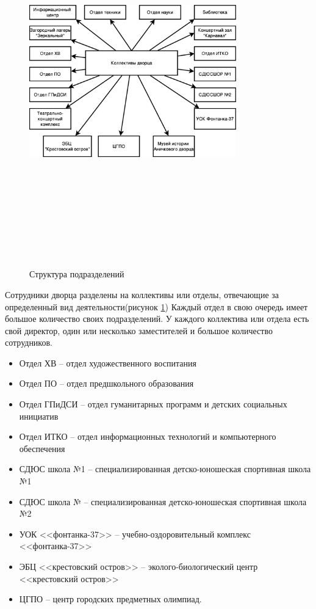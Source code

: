 \documentclass[utf8,usehyperref,12pt]{G7-32}
\begin{document}
\begin{figure}[ht]
   \centering%
   \includegraphics[height=160mm, width=0.8\textwidth, clip, keepaspectratio]{pictures/org_struct.eps}
   \caption{Структура подразделений}\label{fig:org_structure}
 \end{figure}


Сотрудники дворца разделены на коллективы или отделы, отвечающие за определенный вид деятельности(рисунок \ref{fig:org_structure}) 
Каждый отдел в свою очередь имеет большое количество своих подразделений. У каждого коллектива или отдела есть свой директор, один или несколько заместителей и большое количество сотрудников.


\begin{itemize}
\item Отдел ХВ – отдел художественного воспитания
\item Отдел ПО – отдел предшкольного  образования
\item Отдел ГПиДСИ – отдел гуманитарных программ и детских социальных инициатив
\item Отдел ИТКО – отдел информационных технологий и компьютерного обеспечения
\item СДЮС школа №1 – специализированная детско-юношеская спортивная школа №1
\item СДЮС школа № – специализированная детско-юношеская спортивная школа №2
\item УОК <<фонтанка-37>> – учебно-оздоровительный комплекс <<фонтанка-37>>
\item ЭБЦ <<крестовский остров>> – эколого-биологический центр <<крестовский остров>>
\item ЦГПО – центр городских предметных олимпиад.
\end{itemize}
\end{document}

